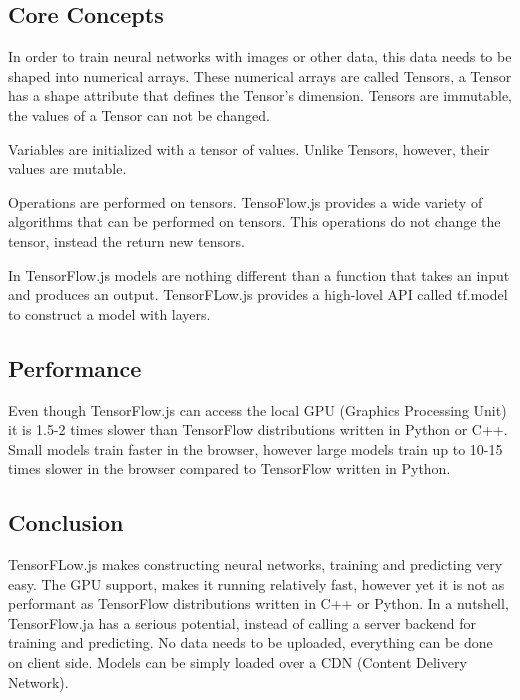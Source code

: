 \subsection{Core Concepts}

In order to train neural networks with images or other data, this data needs to be shaped into numerical arrays. These numerical arrays are called Tensors, a Tensor has a shape attribute that defines the Tensor's dimension. Tensors are immutable, the values of a Tensor can not be changed. \cite{TenosrFLowJs}



Variables are initialized with a tensor of values. Unlike Tensors, however, their values are mutable.



Operations are performed on tensors. TensoFlow.js provides a wide variety of algorithms that can be performed on tensors. This operations do not change the tensor, instead the return new tensors.



In TensorFlow.js models are nothing different than a function that takes an input and produces an output. TensorFLow.js provides a high-lovel API called tf.model to construct a model with layers.



\subsection{Performance}
Even though TensorFlow.js can access the local GPU (Graphics Processing Unit) it is 1.5-2 times slower than TensorFlow distributions written in Python or C++. 
Small models train faster in the browser, however large models train up to 10-15 times slower in the browser compared to TensorFlow written in Python. \cite{TenosrFLowJs}

\subsection{Conclusion}
TensorFLow.js makes constructing neural networks, training and predicting very easy. The GPU support, makes it running relatively fast, however yet it is not as performant as TensorFlow distributions written in C++ or Python. In a nutshell, TensorFlow.ja has a serious potential, instead of calling a server backend for training and predicting. No data needs to be uploaded, everything can be done on client side. Models can be simply loaded over a CDN (Content Delivery Network).
